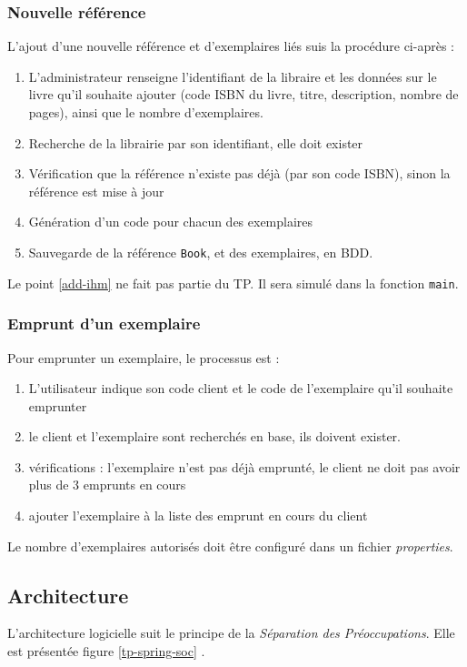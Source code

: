 \documentclass[small,algo]{dushClass}
\begin{document}
\subsubsection{Nouvelle référence}\label{spec-sssec}
L'ajout d'une nouvelle référence et d'exemplaires liés suis la procédure ci-après :
\begin{enumerate}
\item\label{add-ihm} L'administrateur renseigne l'identifiant de la libraire et les données sur le livre qu'il souhaite ajouter (code ISBN du livre, titre, description, nombre de pages), ainsi que le nombre d'exemplaires.
\item Recherche de la librairie par son identifiant, elle doit exister
\item Vérification que la référence n'existe pas déjà (par son code ISBN), sinon la référence est mise à jour
\item Génération d'un code pour chacun des exemplaires
\item Sauvegarde de la référence \texttt{Book}, et des exemplaires, en BDD.\\
\end{enumerate}

Le point \ref{add-ihm} ne fait pas partie du TP. Il sera simulé dans la fonction \texttt{main}.

\subsubsection{Emprunt d'un exemplaire}

Pour emprunter un exemplaire, le processus est :
\begin{enumerate}
\item L'utilisateur indique son code client et le code de l'exemplaire qu'il souhaite emprunter
\item le client et l'exemplaire sont recherchés en base, ils doivent exister.
\item vérifications : l'exemplaire n'est pas déjà emprunté, le client ne doit pas avoir plus de 3 emprunts en cours
\item ajouter l'exemplaire à la liste des emprunt en cours du client\\
\end{enumerate}

Le nombre d'exemplaires autorisés doit être configuré dans un fichier \emph{properties}.

\subsection{Architecture}
L'architecture logicielle suit le principe de la \emph{Séparation des Préoccupations}. Elle est présentée figure \ref{tp-spring-soc} .\\
\end{document}
